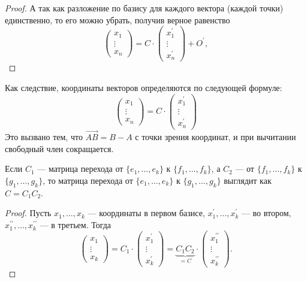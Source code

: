 \begin{proof}
    А так как разложение по базису для каждого вектора (каждой точки) единственно, то его можно убрать, получив верное равенство
    $$
    \begin{pmatrix}
        x_1\\
        \vdots\\
        x_n
    \end{pmatrix} = C \cdot
    \begin{pmatrix}
        x_1^\prime\\
        \vdots\\
        x_n^\prime
    \end{pmatrix} + O^\prime,
    $$
\end{proof}

\begin{remark}
    Как следствие, координаты векторов определяются по следующей формуле:
    $$
    \begin{pmatrix}
        x_1\\
        \vdots\\
        x_n
    \end{pmatrix} = C \cdot
    \begin{pmatrix}
        x_1^\prime\\
        \vdots\\
        x_n^\prime
    \end{pmatrix}
    $$
    Это вызвано тем, что $\overrightarrow{AB} = B - A$ с точки зрения координат, и при вычитании свободный член сокращается.
\end{remark}

\begin{statement}
    Если $C_1$ --- матрица перехода от $\{e_1, \ldots, e_k\}$ к $\{f_1, \ldots, f_k\}$, а $C_2$ --- от $\{f_1, \ldots, f_k\}$ к $\{g_1, \ldots, g_k\}$, то матрица перехода от $\{e_1, \ldots, e_k\}$ к $\{g_1, \ldots, g_k\}$ выглядит как $C = C_1C_2$.
\end{statement}

\begin{proof}
    Пусть $x_1, \ldots, x_k$ --- координаты в первом базисе, $x_1^\prime, \ldots, x_k^\prime$ --- во втором, $x_1^{\prime\prime}, \ldots, x_k^{\prime\prime}$ --- в третьем. Тогда
    $$
    \begin{pmatrix}
        x_1\\
        \vdots\\
        x_k
    \end{pmatrix} = C_1 \cdot
    \begin{pmatrix}
        x_1^\prime\\
        \vdots\\
        x_k^\prime
    \end{pmatrix} = \underbrace{C_1C_2}_{{} = C} \cdot
    \begin{pmatrix}
        x_1^{\prime\prime}\\
        \vdots\\
        x_k^{\prime\prime}
    \end{pmatrix}.
    $$
\end{proof}


